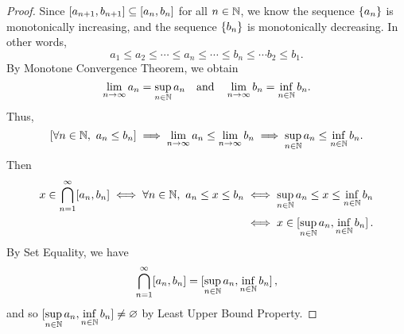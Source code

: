 \documentclass[11pt,openany]{article}
\begin{document}
\begin{proof}
	Since $\intcc{a_{n+1},b_{n+1}}\subseteq\intcc{a_n,b_n}$ for all $n\in\mathbb{N}$, we know  the sequence $\set{a_n}$ is monotonically increasing, and the sequence $\set{b_n}$ is monotonically decreasing. In other words, \[
	a_1\leq a_2\leq\cdots\leq a_n\leq \cdots\leq b_n\leq\cdots b_2\leq b_1.
	\] By Monotone Convergence Theorem, we obtain \[
	\lim\limits_{n\to\infty}a_n=\sup_{n\in\mathbb{N}} a_n\quad\text{and}\quad\lim\limits_{n\to\infty}b_n=\inf\limits_{n\in\mathbb{N}}b_n.
	\] 
	Thus, \[
	[\forall n\in\mathbb{N},\ a_n\leq b_n]\implies \lim\limits_{n\to\infty}a_n\leq\lim\limits_{n\to\infty}b_n\\
	\implies\sup\limits_{n\in\mathbb{N}} a_n\leq\inf\limits_{n\in\mathbb{N}} b_n.
	\]
Then \begin{align*}
x\in\bigcap_{n=1}^\infty[a_n,b_n]\iff \forall n\in\N,\ a_n\leq x\leq b_n
&\iff \sup\limits_{n\in\N} a_n\leq x\leq \inf\limits_{n\in\N} b_n\\
&\iff x\in\intcc[0]{\sup\limits_{n\in\N} a_n, \inf\limits_{n\in\N} b_n}.
\end{align*} By Set Equality, we have \[
\bigcap_{n=1}^\infty[a_n,b_n]=\intcc[0]{\sup\limits_{n\in\N} a_n, \inf\limits_{n\in\N} b_n},
\] and so $\intcc[0]{\sup\limits_{n\in\N} a_n, \inf\limits_{n\in\N} b_n}\neq\varnothing$ by Least Upper Bound Property.
\end{proof}

\vfill
\end{document}
